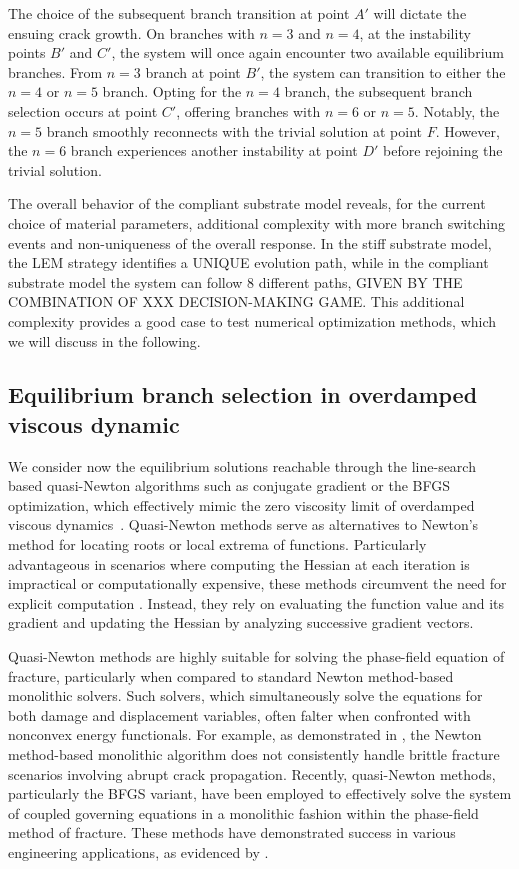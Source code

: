 The choice of the subsequent branch transition at point $A'$ will dictate the ensuing crack growth. On branches with $n=3$ and $n=4$, at the instability points $B'$ and $C'$, the system will once again encounter two available equilibrium branches. From $n=3$ branch  at point $B'$, the system can transition to either the $n=4$ or $n=5$ branch. Opting for the $n=4$ branch, the subsequent branch selection occurs at point $C'$, offering branches with $n=6$ or $n=5$. Notably, the $n=5$ branch smoothly reconnects with the trivial solution at point $F$. However, the $n=6$ branch experiences another instability at point $D'$ before rejoining the trivial solution. 

The overall behavior of the compliant substrate model reveals, for the current choice of material parameters, additional complexity with more branch switching events and non-uniqueness of the overall response.  In the stiff substrate model, the LEM strategy identifies a UNIQUE evolution path, while in the compliant substrate model the system can follow 8 different paths, GIVEN BY THE COMBINATION OF XXX DECISION-MAKING GAME. This additional complexity provides a good case to test numerical optimization methods, which we will discuss in the following.

\subsection{Equilibrium branch selection in overdamped viscous dynamic}
We consider now the equilibrium solutions reachable through the line-search based quasi-Newton algorithms such as  conjugate gradient or the BFGS optimization, which effectively  mimic the zero viscosity limit of overdamped viscous dynamics~\cite{SALMAN2012219}. Quasi-Newton methods serve as alternatives to Newton's method for locating roots or local extrema of functions. Particularly advantageous in scenarios where computing the Hessian at each iteration is impractical or computationally expensive, these methods circumvent the need for explicit computation . Instead, they rely on evaluating the function value and its gradient and updating the Hessian by analyzing successive gradient vectors.

Quasi-Newton methods are highly suitable for solving the phase-field equation of fracture, particularly when compared to standard Newton method-based monolithic solvers. Such solvers, which simultaneously  solve the equations for both damage and displacement variables, often falter when confronted with nonconvex energy functionals. For example, as demonstrated in \cite{Wick2017-bo}, the Newton method-based monolithic algorithm does not consistently handle brittle fracture scenarios involving abrupt crack propagation. Recently, quasi-Newton methods, particularly the BFGS variant, have been employed to effectively solve the system of coupled governing equations in a monolithic fashion within the phase-field method of fracture. These methods have demonstrated success in various engineering applications, as evidenced by \cite{Kristensen2020-zy,Wu2020-qk,Salman2021-mn,Liu2022-ix}.

